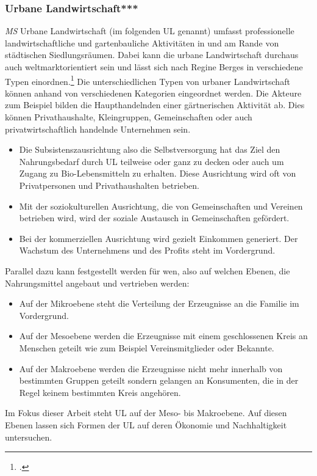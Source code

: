 \documentclass{scrartcl}
\begin{document}
\subsubsection[UL]{Urbane Landwirtschaft***}\textit{MS}
Urbane Landwirtschaft (im folgenden UL genannt) umfasst professionelle landwirtschaftliche und gartenbauliche Aktivitäten in und am Rande von städtischen Siedlungsräumen. Dabei kann die urbane Landwirtschaft durchaus auch weltmarktorientiert sein und lässt sich nach Regine Berges in verschiedene Typen einordnen.\footcite[]{} Die unterschiedlichen Typen von urbaner Landwirtschaft können anhand von verschiedenen Kategorien eingeordnet werden. Die Akteure zum Beispiel bilden die Haupthandelnden einer gärtnerischen Aktivität ab. Dies können Privathaushalte, Kleingruppen, Gemeinschaften oder auch privatwirtschaftlich handelnde Unternehmen sein. 

\begin{itemize}
\item Die Subsistenszausrichtung also die Selbstversorgung hat das Ziel den Nahrungsbedarf durch UL teilweise oder ganz zu decken oder auch um Zugang zu Bio-Lebensmitteln zu erhalten. Diese Ausrichtung wird oft von Privatpersonen und Privathaushalten betrieben. 
\item Mit der soziokulturellen Ausrichtung, die von Gemeinschaften und Vereinen betrieben wird, wird der soziale Austausch in Gemeinschaften gefördert. 
\item Bei der kommerziellen Ausrichtung wird gezielt Einkommen generiert. Der Wachstum des Unternehmens und des Profits steht im Vordergrund. 
\end{itemize}

Parallel dazu kann festgestellt werden für wen, also auf welchen Ebenen, die Nahrungsmittel angebaut und vertrieben werden:

\begin{itemize}
\item Auf der Mikroebene steht die Verteilung der Erzeugnisse an die Familie im Vordergrund.
\item Auf der Mesoebene werden die Erzeugnisse mit einem geschlossenen Kreis an Menschen geteilt wie zum Beispiel Vereinsmitglieder oder Bekannte.
\item Auf der Makroebene werden die Erzeugnisse nicht mehr innerhalb von bestimmten Gruppen geteilt sondern gelangen an Konsumenten, die in der Regel keinem bestimmten Kreis angehören. 
\end{itemize}

Im Fokus dieser Arbeit steht UL auf der Meso- bis Makroebene. Auf diesen Ebenen lassen sich Formen der UL auf deren Ökonomie und Nachhaltigkeit untersuchen.
\end{document}
